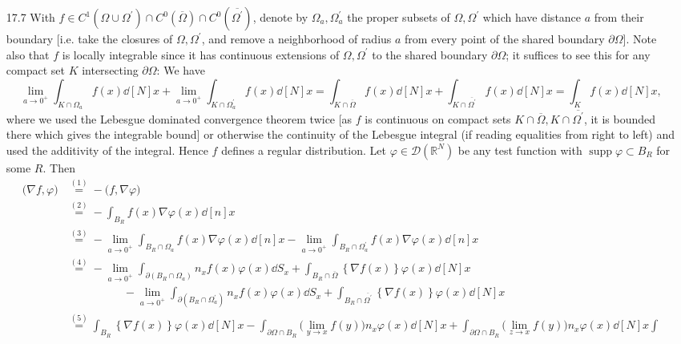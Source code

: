 \documentclass[11pt]{article}
\newcommand{\cbr}[1]{\left\{#1\right\}}
\newcommand{\eq}[1]{\overset{(#1)}{=}}
\DeclareMathOperator{\supp}{supp}
\begin{document}
\begin{enumerate}
    \hrulefill

    \item[17.7] With $f\in C^1(\Omega\cup \Omega^\prime)\cap C^0(\overline \Omega)\cap C^0(\overline{\Omega^\prime})$, denote by $\Omega_a,\Omega^\prime_a$ the proper subsets of $\Omega,\Omega^\prime$ which have distance $a$ from their boundary [i.e. take the closures of $\Omega,\Omega^\prime$, and remove a neighborhood of radius $a$ from every point of the shared boundary $\partial \Omega$]. Note also that $f$ is locally integrable since it has continuous extensions of $\Omega,\Omega^\prime$ to the shared boundary $\partial \Omega$; it suffices to see this for any compact set $K$ intersecting $\partial \Omega$: We have %
    \[\lim_{a\to 0^+}\int_{K\cap \Omega_a}f(x)\dd[N]x+\lim_{a\to 0^+}\int_{K\cap\Omega^\prime_a} f(x)\dd[N]x = \int_{K\cap\overline{\Omega}}f(x)\dd[N]x + \int_{K\cap\overline{\Omega^\prime}}f(x)\dd[N]x = \int_{K}f(x)\dd[N]x,\] where we used the Lebesgue dominated convergence theorem twice [as $f$ is continuous on compact sets $K\cap\overline{\Omega},K\cap\overline{\Omega^\prime}$, it is bounded there which gives the integrable bound] or otherwise the continuity of the Lebesgue integral (if reading equalities from right to left) and used the additivity of the integral. Hence $f$ defines a regular distribution. Let $\varphi\in\mathcal{D}(\mathbb{R}^N)$ be any test function with $\supp\varphi\subset B_R$ for some $R$. Then 
    \begin{align*}
        \Big(\nabla f,\varphi\Big)&\eq{1} -\Big(f,\nabla \varphi\Big)\\
        &\eq{2} -\int_{B_R}f(x)\nabla\varphi(x)\dd[n]x\\
        &\eq{3} -\lim_{a\to 0^+}\int_{B_R\cap\Omega_a}f(x)\nabla\varphi(x)\dd[n]x -\lim_{a\to 0^+}\int_{B_R\cap\Omega^\prime_a}f(x)\nabla\varphi(x)\dd[n]x\\
        &\eq{4} -\lim_{a\to 0^+}\int_{\partial (B_R\cap \Omega_a)}n_xf(x)\varphi(x)\dd S_x + \int_{B_R\cap\overline\Omega}\cbr{\nabla f(x)}\varphi(x)\dd[N]x\\
        &\hspace{5em} -\lim_{a\to 0^+}\int_{\partial (B_R\cap \Omega^\prime_a)}n_xf(x)\varphi(x)\dd S_x + \int_{B_R\cap\overline{\Omega^\prime}}\cbr{\nabla f(x)}\varphi(x)\dd[N]x\\
        &\eq{5} \int_{B_R}\cbr{\nabla f(x)}\varphi(x)\dd[N]x - \int_{\partial\Omega\cap B_R} \Big(\lim_{y\to x}f(y)\Big)n_x\varphi(x)\dd[N]x + \int_{\partial\Omega\cap B_R} \Big(\lim_{z\to x}f(y)\Big)n_x\varphi(x)\dd[N]x\int

\end{align*}
\end{enumerate}
\end{document}
